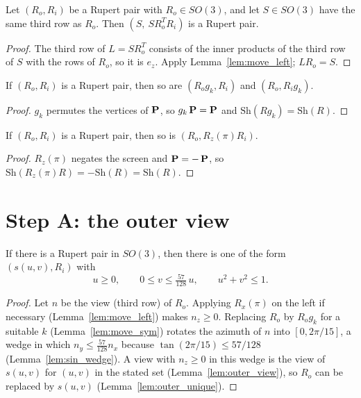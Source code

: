 \begin{lemma}
\label{lem:outer_unique}
\leanok
{}
Let $(R_o, R_i)$ be a Rupert pair with $R_o \in SO(3)$, and let $S \in SO(3)$ have the same
third row as $R_o$. Then $(S,\ S R_o^T R_i)$ is a Rupert pair.
\end{lemma}
\begin{proof}
\leanok
The third row of $L = S R_o^T$ consists of the inner products of the third row of $S$ with
the rows of $R_o$, so it is $e_z$. Apply Lemma~\ref{lem:move_left}; $L R_o = S$.
\end{proof}

\begin{lemma}[Symmetries]
\label{lem:move_sym}
\leanok
{}
If $(R_o, R_i)$ is a Rupert pair, then so are $(R_o g_k, R_i)$ and $(R_o, R_i g_k)$.
\end{lemma}
\begin{proof}
\leanok
$g_k$ permutes the vertices of $\operatorname{\mathbf{P}}$, so $g_k \operatorname{\mathbf{P}} = \operatorname{\mathbf{P}}$ and
$\mathrm{Sh}(R g_k) = \mathrm{Sh}(R)$.
\end{proof}

\begin{lemma}
\label{lem:move_halfturn}
\leanok
{}
If $(R_o, R_i)$ is a Rupert pair, then so is $(R_o, R_z(\pi) R_i)$.
\end{lemma}
\begin{proof}
\leanok
$R_z(\pi)$ negates the screen and $\operatorname{\mathbf{P}} = -\operatorname{\mathbf{P}}$, so
$\mathrm{Sh}(R_z(\pi) R) = -\mathrm{Sh}(R) = \mathrm{Sh}(R)$.
\end{proof}

\section{Step A: the outer view}

\begin{lemma}
\label{lem:step_outer}
\leanok
{}
If there is a Rupert pair in $SO(3)$, then there is one of the form
$(s(u, v), R_i)$ with
\[
  u \ge 0, \qquad 0 \le v \le \tfrac{57}{128}\, u, \qquad u^2 + v^2 \le 1.
\]
\end{lemma}
\begin{proof}
\leanok
Let $n$ be the view (third row) of $R_o$. Applying $R_x(\pi)$ on the left if necessary
(Lemma~\ref{lem:move_left}) makes $n_z \ge 0$. Replacing $R_o$ by $R_o g_k$ for a
suitable $k$ (Lemma~\ref{lem:move_sym}) rotates the azimuth of $n$ into
$[0, 2\pi/15]$, a wedge in which $n_y \le \frac{57}{128} n_x$ because
$\tan(2\pi/15) \le 57/128$ (Lemma~\ref{lem:sin_wedge}). A view with $n_z \ge 0$ in this
wedge is the view of $s(u, v)$ for $(u, v)$ in the stated set
(Lemma~\ref{lem:outer_view}), so $R_o$ can be replaced by $s(u, v)$
(Lemma~\ref{lem:outer_unique}).
\end{proof}

